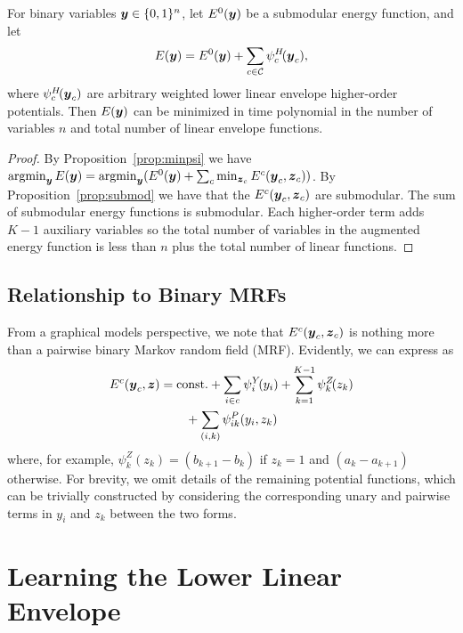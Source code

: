\documentclass[10pt,journal,letterpaper,compsoc]{IEEEtran}
\begin{document}
\begin{theorem}
\label{thm:inference}
For binary variables ${\boldsymbol{y}} \in \{0, 1\}^n$, let $E^0\!\left({\boldsymbol{y}}\right)$
be a submodular energy function, and let
\[
\energy{\by} = E^0\!\left(\by\right) + \sum_{c \in \C} \psi^H_c\!(\by_c),
\]
where $\psi^H_c\!({\boldsymbol{y}}_c)$ are arbitrary weighted lower linear envelope
higher-order potentials. Then $E\!\left({\boldsymbol{y}}\right)$ can be minimized in time
polynomial in the number of variables $n$ and total number of linear
envelope functions.
\end{theorem}
%
\begin{proof}
  By Proposition~\ref{prop:minpsi} we have $\mathop{\textrm{argmin}}_{{\boldsymbol{y}}} E({\boldsymbol{y}}) =
  \mathop{\textrm{argmin}}_{{\boldsymbol{y}}} (E^0\!\left({\boldsymbol{y}}\right) + \sum_c \min_{{\boldsymbol{z}}_c}
  E^c({\boldsymbol{y}}_c, {\boldsymbol{z}}_c))$. By Proposition~\ref{prop:submod} we have that
  the $E^c({\boldsymbol{y}}_c, {\boldsymbol{z}}_c)$ are submodular. The sum of submodular energy
  functions is submodular. Each higher-order term adds $K - 1$
  auxiliary variables so the total number of variables in the
  augmented energy function is less than $n$ plus the total number of
  linear functions.
\end{proof}
\bigskip

\subsection{Relationship to Binary MRFs}

From a graphical models perspective, we note that $E^c({\boldsymbol{y}}_c, {\boldsymbol{z}}_c)$
is nothing more than a pairwise binary Markov random field
(MRF). Evidently, we can express  as
%
\begin{multline}
  E^c(\by_c, \bz) = \textrm{const.} + \sum_{i \in c} \psi^Y_i\!(y_i) + \sum_{k= 1}^{K-1} \psi^Z_k\!(z_k)\\
  {}+ \sum_{(i,k)} \psi^P_{ik}(y_i, z_k)
  \label{eqn:energy_z}
\end{multline}
%
where, for example, $\psi^Z_k\!(z_k) = \left( b_{k+1} - b_k \right)$
if $z_k = 1$ and $\left( a_k - a_{k+1} \right)$ otherwise. For
brevity, we omit details of the remaining potential functions, which
can be trivially constructed by considering the corresponding unary
and pairwise terms in $y_i$ and $z_k$ between the two forms.

\section{Learning the Lower Linear Envelope}
\label{sec:learning}
\end{document}
